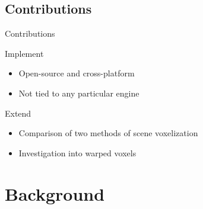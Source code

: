 \documentclass[10pt]{beamer}
\begin{document}
\subsection{Contributions}
\begin{frame}{Contributions}
  \begin{block}{Implement}
    \begin{itemize}
      \item Open-source and cross-platform
      \item Not tied to any particular engine
    \end{itemize}
  \end{block}

  \begin{block}{Extend}
    \begin{itemize}
      \item Comparison of two methods of scene voxelization
      \item Investigation into warped voxels
    \end{itemize}
  \end{block}

\end{frame}

\section{Background}

\end{document}
